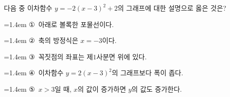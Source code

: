 다음 중 이차함수 $y=-2(x-3)^2+2$의 그래프에 대한 설명으로 옳은 것은?
\par\medskip\par\noindent\hangindent=1.4em {\small ①}\ 아래로 볼록한 포물선이다.\par\noindent\hangindent=1.4em {\small ②}\ 축의 방정식은 $x=-3$이다.\par\noindent\hangindent=1.4em {\small ③}\ 꼭짓점의 좌표는 제$1$사분면 위에 있다.\par\noindent\hangindent=1.4em {\small ④}\ 이차함수 $y=2(x-3)^2$의 그래프보다 폭이 좁다.\par\noindent\hangindent=1.4em {\small ⑤}\ $x>3$일 때, $x$의 값이 증가하면 $y$의 값도 증가한다.\par\medskip
